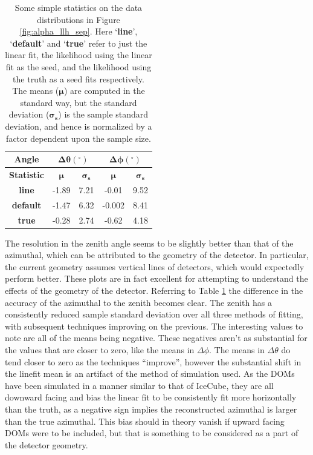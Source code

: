\begin{table}[H]
  \centering
  \begin{tabular}{|c|c|c|c|c|} 
    \hline
    \textbf{Angle} & \multicolumn{2}{|c|}{$\bm{\Delta\theta(^{\circ})}$} & \multicolumn{2}{|c|}{$\bm{\Delta\phi(^{\circ})}$} \\
    \hline\hline
    \textbf{Statistic} & $\bm{\mu}$ & $\bm{\sigma_{s}}$ & $\bm{\mu}$ & $\bm{\sigma_{s}}$ \\
    \hline\hline
    \textbf{line} & -1.89 & 7.21 & -0.01 & 9.52 \\
    \hline
    \textbf{default} & -1.47 & 6.32 & -0.002 & 8.41 \\
    \hline
    \textbf{true} & -0.28 & 2.74 & -0.62 & 4.18 \\
    \hline
  \end{tabular}
  \caption{Some simple statistics on the data distributions in Figure \ref{fig:alpha_llh_sep}. Here `\textbf{line}', `\textbf{default}' and `\textbf{true}' refer to just the linear fit, the likelihood using the linear fit as the seed, and the likelihood using the truth as a seed fits respectively. The means ($\bm{\mu}$) are computed in the standard way, but the standard deviation ($\bm{\sigma_{s}}$) is the sample standard deviation, and hence is normalized by a factor dependent upon the sample size. }
  \label{tab:angular_diff}
\end{table}

The resolution in the zenith angle seems to be slightly better than that of the azimuthal, which can be attributed to the geometry of the detector. In particular, the current geometry assumes vertical lines of detectors, which would expectedly perform better. These plots are in fact excellent for attempting to understand the effects of the geometry of the detector. Referring to Table \ref{tab:angular_diff} the difference in the accuracy of the azimuthal to the zenith becomes clear. The zenith has a consistently reduced sample standard deviation over all three methods of fitting, with subsequent techniques improving on the previous. The interesting values to note are all of the means being negative. These negatives aren't as substantial for the values that are closer to zero, like the means in $\Delta\phi$. The means in $\Delta\theta$ do tend closer to zero as the techniques ``improve'', however the substantial shift in the linefit mean is an artifact of the method of simulation used. As the DOMs have been simulated in a manner similar to that of IceCube, they are all downward facing and bias the linear fit to be consistently fit more horizontally than the truth, as a negative sign implies the reconstructed azimuthal is larger than the true azimuthal. This bias should in theory vanish if upward facing DOMs were to be included, but that is something to be considered as a part of the detector geometry.

